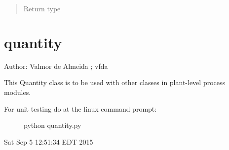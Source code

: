 \documentclass[letterpaper,10pt,openany,oneside,english]{sphinxmanual}
\begin{document}
\begin{fulllineitems}
\begin{fulllineitems}
\begin{quote}
\begin{description}
\item[{Return type}] \leavevmode
{}

\end{description}\end{quote}

\end{fulllineitems}


\end{fulllineitems}



\section{quantity}
\label{\detokenize{support_rst/quantity:module-quantity}}\label{\detokenize{support_rst/quantity:quantity}}\label{\detokenize{support_rst/quantity::doc}}
Author: Valmor de Almeida ; vfda

This Quantity class is to be used with other classes in plant-level process modules.
\begin{description}
\item[{For unit testing do at the linux command prompt:}] \leavevmode
python quantity.py

\end{description}

Sat Sep  5 12:51:34 EDT 2015
\end{document}
